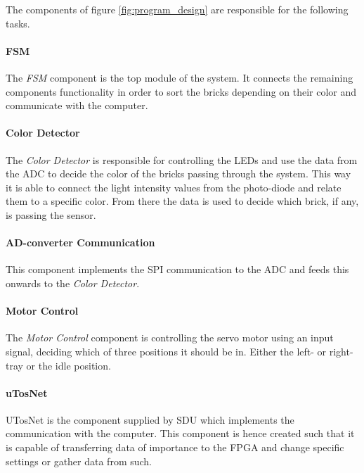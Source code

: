 The components of figure \ref{fig:program_design} are responsible for the following tasks.

\paragraph*{FSM}
The \textit{FSM} component is the top module of the system.
It connects the remaining components functionality in order to sort the bricks depending on their color and communicate with the computer.

\paragraph*{Color Detector}
The \textit{Color Detector} is responsible for controlling the LEDs and use the data from the ADC to decide the color of the bricks passing through the system.
This way it is able to connect the light intensity values from the photo-diode and relate them to a specific color.
From there the data is used to decide which brick, if any, is passing the sensor.

\paragraph*{AD-converter Communication}
This component implements the SPI communication to the ADC and feeds this onwards to the \textit{Color Detector}.


\paragraph*{Motor Control}
The \textit{Motor Control} component is controlling the servo motor using an input signal, deciding which of three positions it should be in.
Either the left- or right-tray or the idle position.

\paragraph*{uTosNet}
UTosNet is the component supplied by SDU which implements the communication with the computer.
This component is hence created such that it is capable of transferring data of importance to the FPGA and change specific settings or gather data from such.



